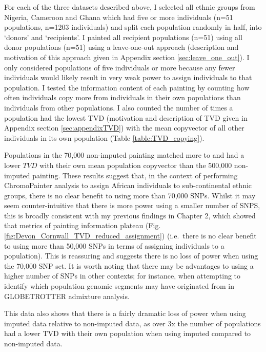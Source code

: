 For each of the three datasets described above, I selected all ethnic groups from Nigeria, Cameroon and Ghana which had five or more individuals (n=51 populations, n=1203 individuals) and split each population randomly in half, into `donors' and `recipients'. I painted all recipient populations (n=51) using all donor populations (n=51) using a leave-one-out approach (description and motivation of this approach given in Appendix section \ref{sec:leave_one_out}). I only considered populations of five individuals or more because any fewer individuals would likely result in very weak power to assign individuals to that population. I tested the information content of each painting by counting how often individuals copy more from individuals in their own populations than individuals from other populations. I also counted the number of times a population had the lowest TVD (motivation and description of TVD given in Appendix section \ref{sec:appendixTVD}) with the mean copyvector of all other individuals in its own population (Table \ref{table:TVD_copying}).

Populations in the 70,000 non-imputed painting matched more to and had a lower $TVD$ with their own mean population copyvector than the 500,000 non-imputed painting. These results suggest that, in the context of performing ChromoPainter analysis to assign African individuals to sub-continental ethnic groups, there is no clear benefit to using more than 70,000 SNPs. Whilst it may seem counter-intuitive that there is more power using a smaller number of SNPS, this is broadly consistent with my previous findings in Chapter 2, which showed that metrics of painting information plateau (Fig. \ref{fig:Devon_Cornwall_TVD_reduced_assignment}) (i.e.\ there is no clear benefit to using more than 50,000 SNPs in terms of assigning individuals to a population). This is reassuring and suggests there is no loss of power when using the 70,000 SNP set. It is worth noting that there may be advantages to using a higher number of SNPs in other contexts; for instance, when attempting to identify which population genomic segments may have originated from in GLOBETROTTER admixture analysis.

This data also shows that there is a fairly dramatic loss of power when using imputed data relative to non-imputed data, as over 3x the number of populations had a lower TVD with their own population when using imputed compared to non-imputed data.

